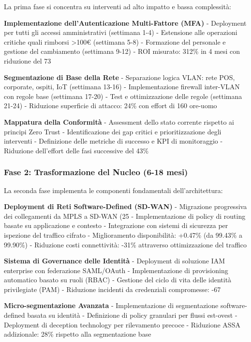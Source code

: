 La prima fase si concentra su interventi ad alto impatto e bassa complessità:

\textbf{Implementazione dell'Autenticazione Multi-Fattore (MFA)}
- Deployment per tutti gli accessi amministrativi (settimana 1-4)
- Estensione alle operazioni critiche quali rimborsi >100€ (settimana 5-8)
- Formazione del personale e gestione del cambiamento (settimana 9-12)
- ROI misurato: 312\% in 4 mesi con riduzione del 73%

\textbf{Segmentazione di Base della Rete}
- Separazione logica VLAN: rete POS, corporate, ospiti, IoT (settimana 13-16)
- Implementazione firewall inter-VLAN con regole base (settimana 17-20)
- Test e ottimizzazione delle regole (settimana 21-24)
- Riduzione superficie di attacco: 24\% con effort di 160 ore-uomo

\textbf{Mappatura della Conformità}
- Assessment dello stato corrente rispetto ai principi Zero Trust
- Identificazione dei gap critici e prioritizzazione degli interventi
- Definizione delle metriche di successo e KPI di monitoraggio
- Riduzione dell'effort delle fasi successive del 43\%

\subsubsection{Fase 2: Trasformazione del Nucleo (6-18 mesi)}

La seconda fase implementa le componenti fondamentali dell'architettura:

\textbf{Deployment di Reti Software-Defined (SD-WAN)}
- Migrazione progressiva dei collegamenti da MPLS a SD-WAN (25%
- Implementazione di policy di routing basate su applicazione e contesto
- Integrazione con sistemi di sicurezza per ispezione del traffico cifrato
- Miglioramento disponibilità: +0.47\% (da 99.43\% a 99.90\%)
- Riduzione costi connettività: -31\% attraverso ottimizzazione del traffico

\textbf{Sistema di Governance delle Identità}
- Deployment di soluzione IAM enterprise con federazione SAML/OAuth
- Implementazione di provisioning automatico basato su ruoli (RBAC)
- Gestione del ciclo di vita delle identità privilegiate (PAM)
- Riduzione incidenti da credenziali compromesse: -67%

\textbf{Micro-segmentazione Avanzata}
- Implementazione di segmentazione software-defined basata su identità
- Definizione di policy granulari per flussi est-ovest
- Deployment di deception technology per rilevamento precoce
- Riduzione ASSA addizionale: 28\% rispetto alla segmentazione base

